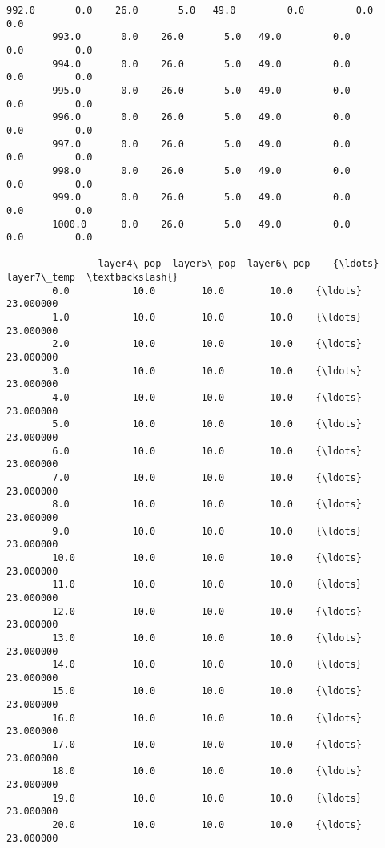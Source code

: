 \documentclass[11pt]{article}
\begin{document}
\begin{Verbatim}[commandchars=\\\{\}]
        992.0       0.0    26.0       5.0   49.0         0.0         0.0         0.0   
        993.0       0.0    26.0       5.0   49.0         0.0         0.0         0.0   
        994.0       0.0    26.0       5.0   49.0         0.0         0.0         0.0   
        995.0       0.0    26.0       5.0   49.0         0.0         0.0         0.0   
        996.0       0.0    26.0       5.0   49.0         0.0         0.0         0.0   
        997.0       0.0    26.0       5.0   49.0         0.0         0.0         0.0   
        998.0       0.0    26.0       5.0   49.0         0.0         0.0         0.0   
        999.0       0.0    26.0       5.0   49.0         0.0         0.0         0.0   
        1000.0      0.0    26.0       5.0   49.0         0.0         0.0         0.0   
        
                layer4\_pop  layer5\_pop  layer6\_pop    {\ldots}     layer7\_temp  \textbackslash{}
        0.0           10.0        10.0        10.0    {\ldots}       23.000000   
        1.0           10.0        10.0        10.0    {\ldots}       23.000000   
        2.0           10.0        10.0        10.0    {\ldots}       23.000000   
        3.0           10.0        10.0        10.0    {\ldots}       23.000000   
        4.0           10.0        10.0        10.0    {\ldots}       23.000000   
        5.0           10.0        10.0        10.0    {\ldots}       23.000000   
        6.0           10.0        10.0        10.0    {\ldots}       23.000000   
        7.0           10.0        10.0        10.0    {\ldots}       23.000000   
        8.0           10.0        10.0        10.0    {\ldots}       23.000000   
        9.0           10.0        10.0        10.0    {\ldots}       23.000000   
        10.0          10.0        10.0        10.0    {\ldots}       23.000000   
        11.0          10.0        10.0        10.0    {\ldots}       23.000000   
        12.0          10.0        10.0        10.0    {\ldots}       23.000000   
        13.0          10.0        10.0        10.0    {\ldots}       23.000000   
        14.0          10.0        10.0        10.0    {\ldots}       23.000000   
        15.0          10.0        10.0        10.0    {\ldots}       23.000000   
        16.0          10.0        10.0        10.0    {\ldots}       23.000000   
        17.0          10.0        10.0        10.0    {\ldots}       23.000000   
        18.0          10.0        10.0        10.0    {\ldots}       23.000000   
        19.0          10.0        10.0        10.0    {\ldots}       23.000000   
        20.0          10.0        10.0        10.0    {\ldots}       23.000000   

\end{Verbatim}
\end{document}
